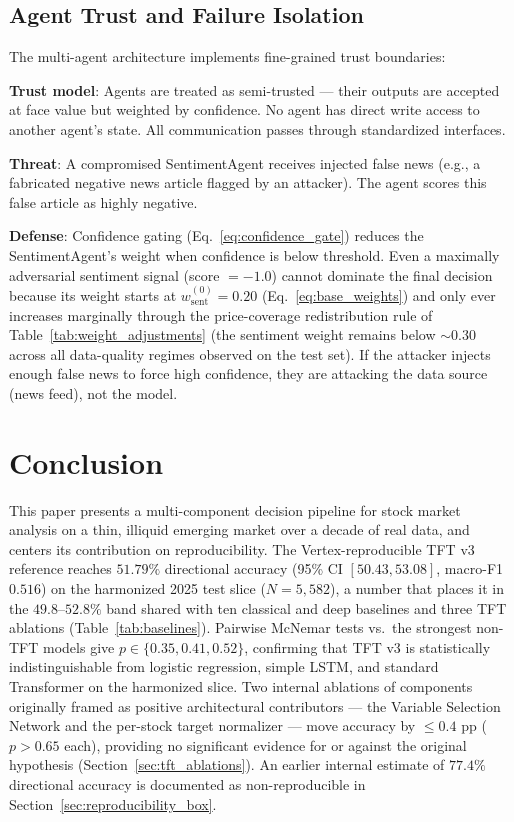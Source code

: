 \documentclass[conference]{IEEEtran}
\begin{document}
\subsection{Agent Trust and Failure Isolation}

The multi-agent architecture implements fine-grained trust boundaries:

\textbf{Trust model}: Agents are treated as semi-trusted — their outputs are accepted at face value but weighted by confidence. No agent has direct write access to another agent's state. All communication passes through standardized interfaces.

\textbf{Threat}: A compromised SentimentAgent receives injected false news (e.g., a fabricated negative news article flagged by an attacker). The agent scores this false article as highly negative.

\textbf{Defense}: Confidence gating (Eq.~\ref{eq:confidence_gate}) reduces the SentimentAgent's weight when confidence is below threshold. Even a maximally adversarial sentiment signal (score $=-1.0$) cannot dominate the final decision because its weight starts at $w^{(0)}_{\mathrm{sent}} = 0.20$ (Eq.~\ref{eq:base_weights}) and only ever increases marginally through the price-coverage redistribution rule of Table~\ref{tab:weight_adjustments} (the sentiment weight remains below $\sim 0.30$ across all data-quality regimes observed on the test set). If the attacker injects enough false news to force high confidence, they are attacking the data source (news feed), not the model.

\section{Conclusion}\label{sec:conclusion}

This paper presents a multi-component decision pipeline for stock market analysis on a thin, illiquid emerging market over a decade of real data, and centers its contribution on reproducibility. The Vertex-reproducible TFT v3 reference reaches $51.79\%$ directional accuracy (95\% CI $[50.43, 53.08]$, macro-F1 $0.516$) on the harmonized 2025 test slice ($N=5{,}582$), a number that places it in the $49.8$--$52.8\%$ band shared with ten classical and deep baselines and three TFT ablations (Table~\ref{tab:baselines}). Pairwise McNemar tests vs.\ the strongest non-TFT models give $p \in \{0.35, 0.41, 0.52\}$, confirming that TFT v3 is statistically indistinguishable from logistic regression, simple LSTM, and standard Transformer on the harmonized slice. Two internal ablations of components originally framed as positive architectural contributors --- the Variable Selection Network and the per-stock target normalizer --- move accuracy by $\leq 0.4$ pp ($p > 0.65$ each), providing no significant evidence for or against the original hypothesis (Section~\ref{sec:tft_ablations}). An earlier internal estimate of $77.4\%$ directional accuracy is documented as non-reproducible in Section~\ref{sec:reproducibility_box}.
\end{document}
